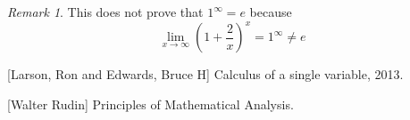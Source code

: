 \documentclass[a4paper]{amsproc}
\theoremstyle{plain}
\numberwithin{equation}{section} %
\numberwithin{figure}{section} %
\theoremstyle{plain}
\theoremstyle{definition}
\theoremstyle{definition}
\theoremstyle{remark}
\newtheorem{rem}[thm]{Remark}
\begin{document}
\begin{rem}\color{red}
This does not prove that $1^\infty=e$ because
\[\lim_{x\to\infty}\left(1+\frac{2}{x}\right)^x=1^\infty\ne e\]
\end{rem}

\begin{thebibliography}{9}
[Larson, Ron and Edwards, Bruce H] Calculus of a single variable, 2013.

[Walter Rudin] Principles of Mathematical Analysis.

\end{thebibliography}
\end{document}
